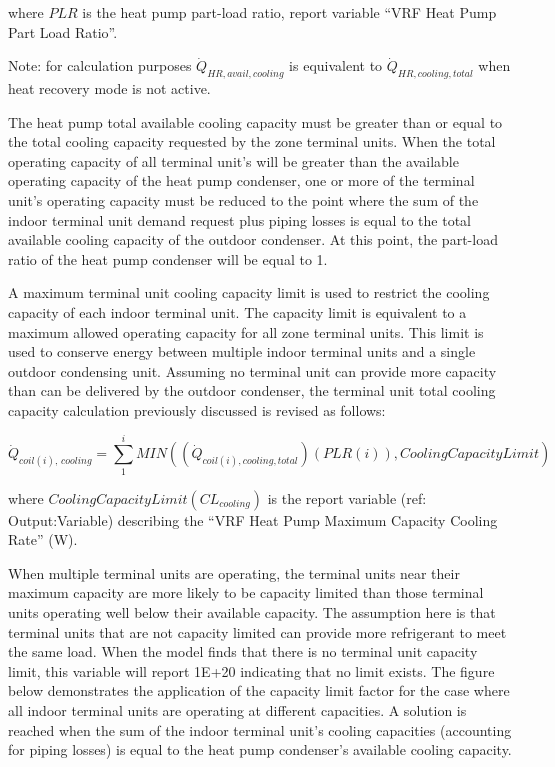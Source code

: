 where \(PLR\) is the heat pump part-load ratio, report variable ``VRF Heat Pump Part Load Ratio''.

Note: for calculation purposes \(\dot{Q}_{HR,avail,cooling}\) is equivalent to \(\dot{Q}_{HR,cooling,total}\) when heat recovery mode is not active.

The heat pump total available cooling capacity must be greater than or equal to the total cooling capacity requested by the zone terminal units. When the total operating capacity of all terminal unit's will be greater than the available operating capacity of the heat pump condenser, one or more of the terminal unit's operating capacity must be reduced to the point where the sum of the indoor terminal unit demand request plus piping losses is equal to the total available cooling capacity of the outdoor condenser. At this point, the part-load ratio of the heat pump condenser will be equal to 1.

A maximum terminal unit cooling capacity limit is used to restrict the cooling capacity of each indoor terminal unit. The capacity limit is equivalent to a maximum allowed operating capacity for all zone terminal units. This limit is used to conserve energy between multiple indoor terminal units and a single outdoor condensing unit. Assuming no terminal unit can provide more capacity than can be delivered by the outdoor condenser, the terminal unit total cooling capacity calculation previously discussed is revised as follows:

\begin{equation}
  \dot{Q}_{coil(i),\,cooling} = \sum\limits_1^i MIN \left( \left( \dot{Q}_{coil(i),cooling,total} \right) \left( PLR(i) \right),CoolingCapacityLimit \right)
\end{equation}

where \(CoolingCapacityLimit(CL_{cooling})\) is the report variable (ref: Output:Variable) describing the ``VRF Heat Pump Maximum Capacity Cooling Rate'' (W).

When multiple terminal units are operating, the terminal units near their maximum capacity are more likely to be capacity limited than those terminal units operating well below their available capacity. The assumption here is that terminal units that are not capacity limited can provide more refrigerant to meet the same load. When the model finds that there is no terminal unit capacity limit, this variable will report 1E+20 indicating that no limit exists.  The figure below demonstrates the application of the capacity limit factor for the case where all indoor terminal units are operating at different capacities. A solution is reached when the sum of the indoor terminal unit's cooling capacities (accounting for piping losses) is equal to the heat pump condenser's available cooling capacity.

